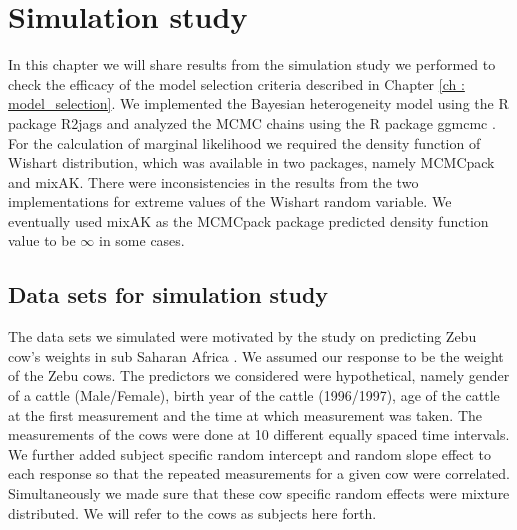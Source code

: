 
\chapter{Simulation study}
\label{ch : simulation_study}

In this chapter we will share results from the simulation study we performed to check the efficacy of the model selection criteria described in Chapter \ref{ch : model_selection}. We implemented the Bayesian heterogeneity model using the R package R2jags \citep{su_r2jags:_2015} and analyzed the MCMC chains using the R package ggmcmc \citep{marin_ggmcmc:_2016}. For the calculation of marginal likelihood we required the density function of Wishart distribution, which was available in two packages, namely MCMCpack and mixAK. There were inconsistencies in the results from the two implementations for extreme values of the Wishart random variable. We eventually used mixAK \citep{komarek_mixak:_2015} as the MCMCpack package predicted density function value to be $\infty$ in some cases.

\section{Data sets for simulation study}
The data sets we simulated were motivated by the study on predicting Zebu cow's weights in sub Saharan Africa \citep{lesosky_live_2012}. We assumed our response to be the weight of the Zebu cows. The predictors we considered were hypothetical, namely gender of a cattle (Male/Female), birth year of the cattle (1996/1997), age of the cattle at the first measurement and the time at which measurement was taken. The measurements of the cows were done at 10 different equally spaced time intervals. We further added subject specific random intercept and random slope effect to each response so that the repeated measurements for a given cow were correlated. Simultaneously we made sure that these cow specific random effects were mixture distributed. We will refer to the cows as subjects here forth.

